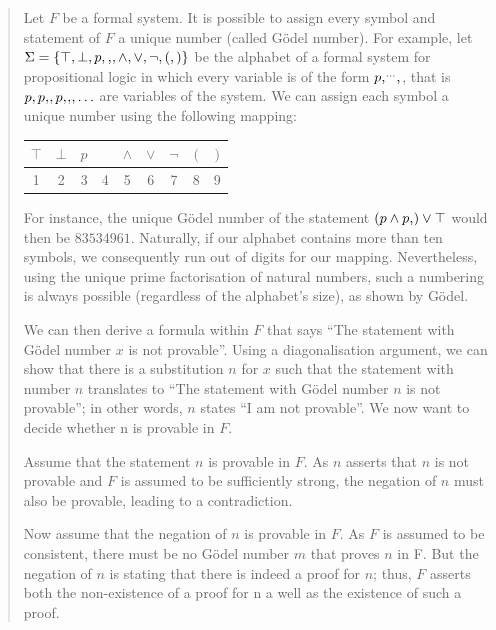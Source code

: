 \documentclass{article}
\newcommand*\vtick{\textsc{\char13}}
\begin{document}
\begin{quote}
Let $F$ be a formal system. It is possible to assign every symbol and statement of $F$ a unique number (called Gödel number). For example, let $\Sigma=\{\top,\bot,p,\vtick,\land,\lor,\lnot,(,)\}$ be the alphabet of a formal system for propositional logic in which every variable is of the form $p\vtick^{\ldots}\vtick$, that is $p,p\vtick,p\vtick\vtick,\ldots$ are variables of the system. We can assign each symbol a unique number using the following mapping:

\begin{center}
\begin{tabular}{| c | c | c | c | c | c | c | c | c |}
\hline $\top$ & $\bot$ & $p$ & \vtick & $\land$ & $\lor$ & $\lnot$ & $($ & $)$ \\
\hline 1 & 2 & 3 & 4 & 5 & 6 & 7 & 8 & 9\\
\hline
\end{tabular}
\end{center}
For instance, the unique Gödel number of the statement $(p\land p\vtick)\lor \top$ would then be $83534961$. Naturally, if our alphabet contains more than ten symbols, we consequently run out of digits for our mapping. Nevertheless, using the unique prime factorisation of natural numbers, such a numbering is always possible (regardless of the alphabet's size), as shown by Gödel.\cite{goedel_incompleteness}

We can then derive a formula within $F$ that says ``The statement with Gödel number $x$ is not provable''. Using a diagonalisation argument, we can show that there is a substitution $n$ for $x$ such that the statement with number $n$ translates to ``The statement with Gödel number $n$ is not provable''; in other words, $n$ states ``I am not provable''. We now want to decide whether n is provable in $F$.

Assume that the statement $n$ is provable in $F$. As $n$ asserts that $n$ is not provable and $F$ is assumed to be sufficiently strong, the negation of $n$ must also be provable, leading to a contradiction.

Now assume that the negation of $n$ is provable in $F$. As $F$ is assumed to be consistent, there must be no Gödel number $m$ that proves $n$ in F. But the negation of $n$ is stating that there is indeed a proof for $n$; thus, $F$ asserts both the non-existence of a proof for n a well as the existence of such a proof.
\end{quote}
\end{document}
